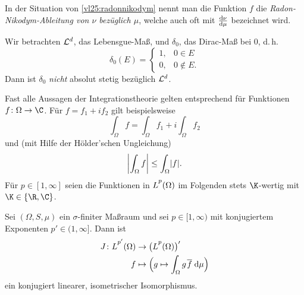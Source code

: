 \nnBemerkung 
In der Situation von \cref{vl25:radonnikodym} nennt man die Funktion $f$ die
\emph{Radon-Nikodym-Ableitung von $\nu$ bezüglich $\mu$}, welche auch oft mit
$\frac{\mathrm d\nu}{\mathrm d\mu}$ bezeichnet wird.

\nnBeispiel Wir betrachten $\mathcal{L}^d$, das Lebensgue-Maß, und $\delta_0$, das
Dirac-Maß bei $0$, d.\,h.  \[ \delta_0(E) = \begin{cases}
1, & 0\in E \\ 0, & 0\notin E . \end{cases} \]
Dann ist $\delta_0$ \emph{nicht} absolut stetig bezüglich
$\mathcal{L}^d$.

\nnBemerkung Fast alle Aussagen der Integrationstheorie gelten entsprechend für
Funktionen $f\colon\Omega\to\C$. Für $f = f_1 + if_2$ gilt beispielsweise
\[ \int_\Omega f = \int_\Omega f_1 + i \int_\Omega f_2 \]
und (mit Hilfe der Hölder'schen Ungleichung)
\[ \abs*{\int_\Omega f} \leq \int_\Omega \abs{f}  . \]
Für $p\in[1,\infty]$ seien die Funktionen in $\Lpp(\Omega)$
im Folgenden stets $\K$-wertig mit $\K\in\{\R,\C\}$.

\begin{thSatz}%
    \label{vl25:dualraumLp}%
    Sei $(\Omega,S,\mu)$ ein $\sigma$-finiter Maßraum und sei $p\in[1,\infty)$
    mit konjugiertem Exponenten $p'\in(1,\infty]$. Dann ist
    \begin{align*}
        J\colon \Lpp[p'](\Omega) &\to \bigl( \Lpp(\Omega) \bigr)'
        \\
        f &\mapsto \Bigl( 
                g \mapsto \int_\Omega g\mkern2mu\ol{f} \dif\mu
            \Bigr)
    \end{align*}
    ein konjugiert linearer, isometrischer Isomorphismus.
\end{thSatz}

